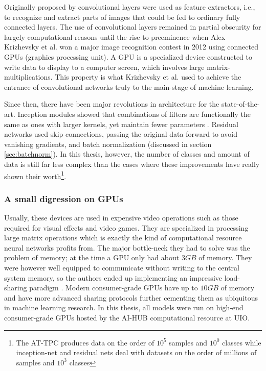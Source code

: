Originally proposed by \citet{Lecun1998} convolutional layers were used as feature extractors, i.e., to recognize and extract parts of images that could be fed to ordinary fully connected layers. The use of convolutional layers remained in partial obscurity for largely computational reasons until the rise to preeminence when Alex Krizhevsky et al. won a major image recognition contest in 2012 \cite{Krizhevsky2012} using connected GPUs (graphics processing unit). A GPU is a specialized device constructed to write data to display to a computer screen, which involves large matrix-multiplications. This property is what Krizhevsky et al. used to achieve the entrance of convolutional networks truly to the main-stage of machine learning. 

Since then, there have been major revolutions in architecture for the state-of-the-art. Inception modules showed that combinations of filters are functionally the same as ones with larger kernels, yet maintain fewer parameters \cite{Szegedy2014}. Residual networks used skip connections, passing the original data forward to avoid vanishing gradients, and batch normalization (discussed in section \ref{sec:batchnorm}). In this thesis, however, the number of classes and amount of data is still far less complex than the cases where these improvements have really shown their worth\footnote{The AT-TPC produces data on the order of $10^5$ samples and $10^0$ classes while inception-net and residual nets deal with datasets on the order of millions of samples and $10^3$ classes}.

\subsubsection{A small digression on GPUs}
Usually, these devices are used in expensive video operations such as those required for visual effects and video games. They are specialized in processing large matrix operations which is exactly the kind of computational resource neural networks profits from. The major bottle-neck they had to solve was the problem of memory; at the time a GPU only had about $3 GB$ of memory. They were however well equipped to communicate without writing to the central system memory, so the authors ended up implementing an impressive load-sharing paradigm \cite{Krizhevsky2012}. Modern consumer-grade GPUs have up to $10 GB$ of memory and have more advanced sharing protocols further cementing them as ubiquitous in machine learning research. In this thesis, all models were run on high-end consumer-grade GPUs hosted by the AI-HUB computational resource at UIO.
